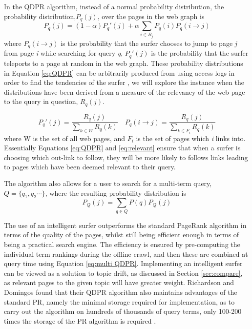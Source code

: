 \documentclass[11pt]{report}
\begin{document}
In the QDPR algorithm, instead of a normal probability distribution, the probability distribution,$P_q(j)$, over the pages in the web graph is 
\begin{equation}\label{eq:QDPR}
P_q(j)=(1-\alpha)P_q'(j)+\alpha\sum_{i\in B_j}P_q(i)P_q(i\rightarrow j)
\end{equation}
where $P_q(i\rightarrow j)$ is the probability that the surfer chooses to jump to page \textit{j} from page \textit{i} while searching for query \textit{q}, $P_q'(j)$ is the probability that the surfer teleports to a page at random in the web graph. These probability distributions in Equation \eqref{eq:QDPR} can be arbitrarily produced from using access logs in order to find the tendencies of the surfer \cite{langville}, we will explore the instance when the distributions have been derived from a measure of the relevancy of the web page to the query in question, $R_q(j)$.

\begin{equation}\label{eq:relevant}
P_q'(j) = \frac{R_q(j)}{\sum_{k\in W} R_q(k)} \quad P_q(i\rightarrow j) = \frac{R_q(j)}{\sum_{k\in F_i}R_q(k)}
\end{equation}
where W is the set of all web pages, and $F_i$ is the set of pages which \textit{i} links into. Essentially Equations \eqref{eq:QDPR} and \eqref{eq:relevant} ensure that when a surfer is choosing which out-link to follow, they will be more likely to follows links leading to pages which have been deemed relevant to their query.

The algorithm also allows for a user to search for a multi-term query, $Q=\{q_1,q_2 \cdots \}$, where the resulting probability distribution is \begin{equation} \label{eq:multi QDPR}
P_Q(j) = \sum_{q\in Q}P(q)P_Q(j)
\end{equation}

The use of an intelligent surfer outperforms the standard PageRank algorithm in terms of the quality of the pages, whilst still being efficient enough in terms of being a practical search engine. The efficiency is ensured by pre-computing the individual term rankings during the offline crawl, and then these are combined at query time using Equation \eqref{eq:multi QDPR}. Implementing an intelligent surfer can be viewed as a solution to topic drift, as discussed in Section \ref{sec:compare}, as relevant pages to the given topic will have greater weight. Richardson and Domingos found that their QDPR algorithm also maintains advantages of the standard PR, namely the minimal storage required for implementation, as to carry out the algorithm on hundreds of thousands of query terms, only 100-200 times the storage of the PR algorithm is required \cite{richardson2002intelligent}.
\end{document}
